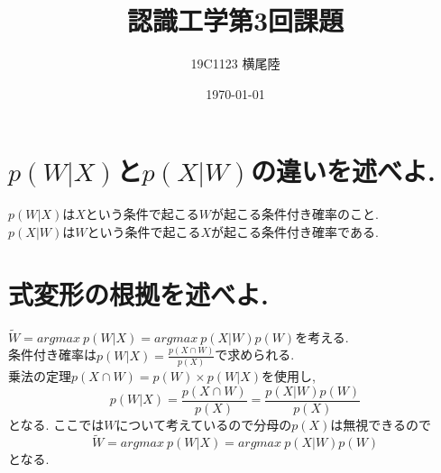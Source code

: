 \documentclass[dvipdfmx]{jsarticle}
\begin{document}
\title{認識工学第3回課題}
\author{19C1123 横尾陸}
\date{\today}
\maketitle

\section{$p(W|X)$と$p(X|W)$の違いを述べよ.}
$p(W|X)$は$X$という条件で起こる$W$が起こる条件付き確率のこと.\\
$p(X|W)$は$W$という条件で起こる$X$が起こる条件付き確率である.

\section{式変形の根拠を述べよ.}
$\tilde{W}=argmax \: p(W|X)=argmax \: p(X|W)p(W)$を考える.\\
条件付き確率は$p(W|X)=\frac{p(X\cap W)}{p(X)}$で求められる.\\
乗法の定理$p(X\cap W)=p(W)\times p(W|X)$を使用し,
$$p(W|X)=\frac{p(X\cap W)}{p(X)}=\frac{p(X|W)p(W)}{p(X)}$$
となる.
ここでは$W$について考えているので分母の$p(X)$は無視できるので
$$\tilde{W}=argmax\:p(W|X)=argmax\:p(X|W)p(W)$$
となる.
\end{document}
